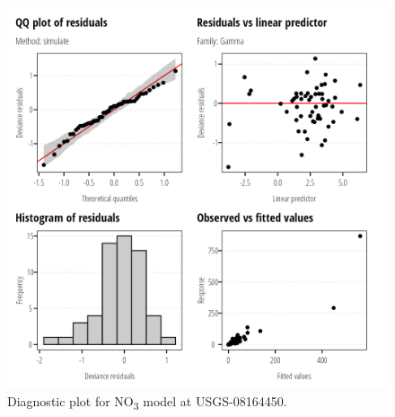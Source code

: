 \documentclass[
]{article}
\begin{document}
\clearpage

\begin{figure}[h]

{\centering \includegraphics{model_assessment_files/figure-pdf/unnamed-chunk-28-1.png}

}

\caption{Diagnostic plot for NO\textsubscript{3} model at
USGS-08164450.}

\end{figure}
\end{document}
